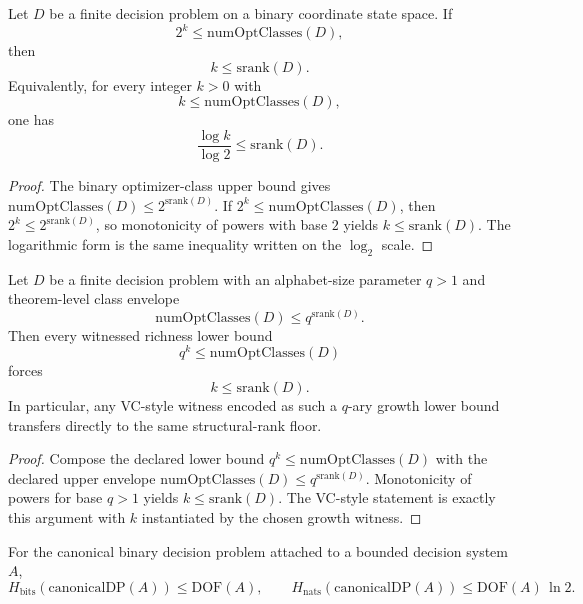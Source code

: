 \begin{theorem}\label{thm:optimizer-class-richness-rank-lower-bound}
Let $D$ be a finite decision problem on a binary coordinate state space. If
\[
2^k \le \mathrm{numOptClasses}(D),
\]
then
\[
k \le \mathrm{srank}(D).
\]
Equivalently, for every integer $k>0$ with
\[
k \le \mathrm{numOptClasses}(D),
\]
one has
\[
\frac{\log k}{\log 2} \le \mathrm{srank}(D).
\]
\end{theorem}

\begin{proof}
The binary optimizer-class upper bound gives $\mathrm{numOptClasses}(D) \le 2^{\mathrm{srank}(D)}$. If $2^k \le \mathrm{numOptClasses}(D)$, then $2^k \le 2^{\mathrm{srank}(D)}$, so monotonicity of powers with base $2$ yields $k \le \mathrm{srank}(D)$. The logarithmic form is the same inequality written on the $\log_2$ scale.
\end{proof}

\begin{theorem}\label{thm:optimizer-class-richness-nonbinary-vc}
Let $D$ be a finite decision problem with an alphabet-size parameter $q>1$ and theorem-level class envelope
\[
\mathrm{numOptClasses}(D) \le q^{\mathrm{srank}(D)}.
\]
Then every witnessed richness lower bound
\[
q^k \le \mathrm{numOptClasses}(D)
\]
forces
\[
k \le \mathrm{srank}(D).
\]
In particular, any VC-style witness encoded as such a $q$-ary growth lower bound transfers directly to the same structural-rank floor.
\end{theorem}

\begin{proof}
Compose the declared lower bound $q^k \le \mathrm{numOptClasses}(D)$ with the declared upper envelope $\mathrm{numOptClasses}(D) \le q^{\mathrm{srank}(D)}$. Monotonicity of powers for base $q>1$ yields $k \le \mathrm{srank}(D)$. The VC-style statement is exactly this argument with $k$ instantiated by the chosen growth witness.
\end{proof}

\begin{theorem}\label{thm:entropy-bound}
For the canonical binary decision problem attached to a bounded decision system $A$,
\[
H_{\mathrm{bits}}(\mathrm{canonicalDP}(A)) \le \mathrm{DOF}(A),
\qquad
H_{\mathrm{nats}}(\mathrm{canonicalDP}(A)) \le \mathrm{DOF}(A)\,\ln 2.
\]
\end{theorem}

